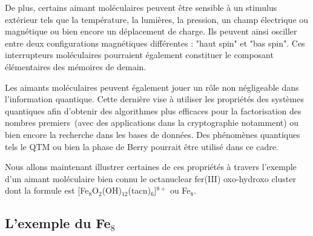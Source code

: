 De plus, certains aimant moléculaires peuvent être sensible à un stimulus extérieur tels que la température, la lumières, la pression, un champ électrique ou magnétique ou bien encore un déplacement de charge. Ils peuvent ainsi osciller entre deux configurations magnétiques différentes : "haut spin" et "bas spin". Ces interrupteurs moléculaires pourraient également constituer le composant élémentaires des mémoires de demain.

Les aimants moléculaires peuvent également jouer un rôle non négligeable dans l'information quantique. Cette dernière vise à utiliser les propriétés des systèmes quantiques afin d'obtenir des algorithmes plus efficaces pour la factorisation des nombres premiers~(avec des applications dans la cryptographie notamment) ou bien encore la recherche dans les bases de données. Des phénomènes quantiques tels le QTM ou bien la phase de Berry pourrait être utilisé dans ce cadre.

Nous allons maintenant illustrer certaines de ces propriétés à travers l'exemple d'un aimant moléculaire bien connu le octanuclear fer(III) oxo-hydroxo cluster dont la formule est [Fe$_8$O$_2$(OH)$_{12}$(tacn)$_6$]$^{8+}$ ou Fe$_8$.

\subsection{L'exemple du Fe$_8$}

